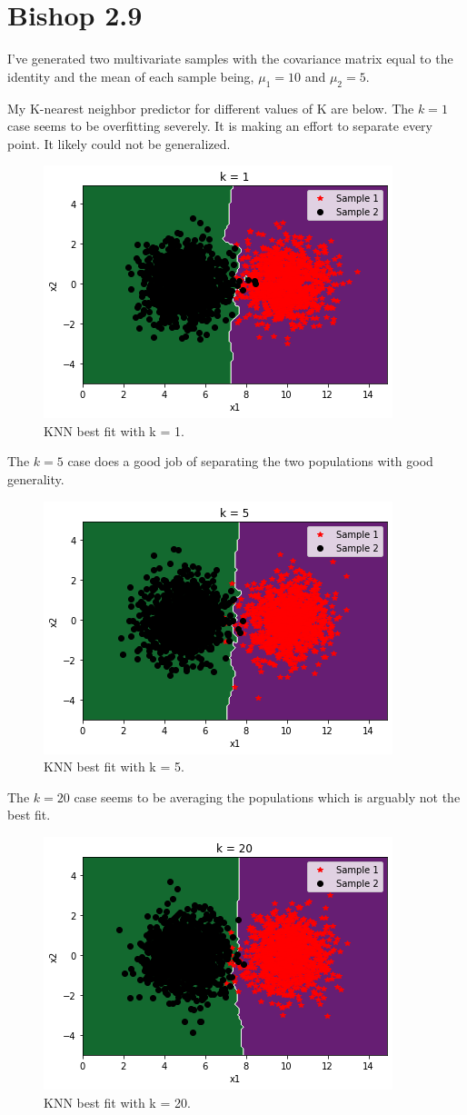 \documentclass[12pt, letterpaper]{article}
\begin{document}
\section*{Bishop 2.9}
I've generated two multivariate samples with the covariance matrix equal to the identity and the mean of each sample being, $\mu_1 = 10$ and $\mu_2 = 5$. 

My K-nearest neighbor predictor for different values of K are below. The $k=1$ case seems to be overfitting severely. It is making an effort to separate every point. It likely could not be generalized.  


\begin{figure}[h]
\caption{KNN best fit with k = 1.}
\centering
\includegraphics[width=0.5\linewidth]{KNN_1.png}
\end{figure}

The $k=5$ case does a good job of separating the two populations with good generality.

\begin{figure}[h]
\caption{KNN best fit with k = 5.}
\centering
\includegraphics[width=0.5\linewidth]{KNN_5.png}
\end{figure}

The $k=20$ case seems to be averaging the populations which is arguably not the best fit. 

\begin{figure}[h]
\caption{KNN best fit with k = 20.}
\centering
\includegraphics[width=0.5\linewidth]{KNN_20.png}
\end{figure}
\end{document}
